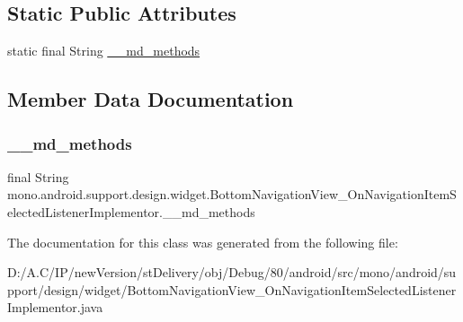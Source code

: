 \subsection*{Static Public Attributes}
\begin{DoxyCompactItemize}
\item 
static final String \hyperlink{classmono_1_1android_1_1support_1_1design_1_1widget_1_1_bottom_navigation_view___on_navigation_ie9d71c6c186664ed279b77f9f21d9a3f_af2f65dc3764a34b31faa520c1b60e1aa}{\+\_\+\+\_\+md\+\_\+methods}
\end{DoxyCompactItemize}


\subsection{Member Data Documentation}
\mbox{\label{classmono_1_1android_1_1support_1_1design_1_1widget_1_1_bottom_navigation_view___on_navigation_ie9d71c6c186664ed279b77f9f21d9a3f_af2f65dc3764a34b31faa520c1b60e1aa}} 
\subsubsection{\texorpdfstring{\+\_\+\+\_\+md\+\_\+methods}{\_\_md\_methods}}
{\footnotesize\ttfamily final String mono.\+android.\+support.\+design.\+widget.\+Bottom\+Navigation\+View\+\_\+\+On\+Navigation\+Item\+Selected\+Listener\+Implementor.\+\_\+\+\_\+md\+\_\+methods\hspace{0.3cm}{\ttfamily [static]}}



The documentation for this class was generated from the following file\+:\begin{DoxyCompactItemize}
\item 
D\+:/\+A.\+C/\+I\+P/new\+Version/st\+Delivery/obj/\+Debug/80/android/src/mono/android/support/design/widget/Bottom\+Navigation\+View\+\_\+\+On\+Navigation\+Item\+Selected\+Listener\+Implementor.\+java\end{DoxyCompactItemize}
